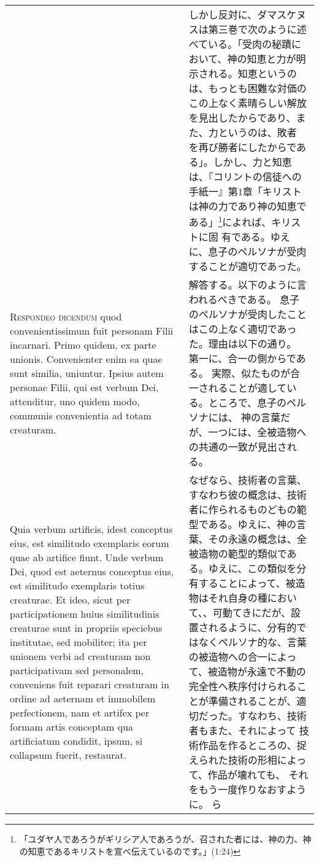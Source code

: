 \documentclass[10pt]{jsarticle} %
\begin{document}
\begin{longtable}{p{21em}p{21em}}
&

しかし反対に、ダマスケヌスは第三巻で次のように述べている。「受肉の秘蹟に
 おいて、神の知恵と力が明示される。知恵というのは、もっとも困難な対価の
 この上なく素晴らしい解放を見出したからであり、また、力というのは、敗者
 を再び勝者にしたからである」。しかし、力と知恵は、『コリントの信徒への
 手紙一』第1章「キリストは神の力であり神の知恵である」\footnote{「ユダヤ人であろうがギリシア人であろうが、召された者には、神の力、神の知恵であるキリストを宣べ伝えているのです。」(1:24)}によれば、キリストに固
 有である。ゆえに、息子のペルソナが受肉することが適切であった。

\\



{\scshape Respondeo dicendum} quod convenientissimum fuit personam Filii
incarnari. Primo quidem, ex parte unionis. Convenienter enim ea quae
sunt similia, uniuntur. Ipsius autem personae Filii, qui est verbum Dei,
attenditur, uno quidem modo, communis convenientia ad totam
creaturam. 

&


解答する。以下のように言われるべきである。
息子のペルソナが受肉したことはこの上なく適切であった。理由は以下の通り。
第一に、合一の側からである。
実際、似たものが合一されることが適している。ところで、息子のペルソナには、
 神の言葉だが、一つには、全被造物への共通の一致が見出される。


\\

Quia verbum artificis, idest conceptus eius, est similitudo
exemplaris eorum quae ab artifice fiunt. Unde verbum Dei, quod est
aeternus conceptus eius, est similitudo exemplaris totius creaturae. Et
ideo, sicut per participationem huius similitudinis creaturae sunt in
propriis speciebus institutae, sed mobiliter; ita per unionem verbi ad
creaturam non participativam sed personalem, conveniens fuit reparari
creaturam in ordine ad aeternam et immobilem perfectionem, nam et
artifex per formam artis conceptam qua artificiatum condidit, ipsum, si
collapsum fuerit, restaurat. 

&


なぜなら、技術者の言葉、すなわち彼の概念は、技術者に作られるものどもの範
 型である。ゆえに、神の言葉、その永遠の概念は、全被造物の範型的類似であ
 る。ゆえに、この類似を分有することによって、被造物はそれ自身の種におい
 て、、可動てきにだが、設置されるように、分有的ではなくペルソナ的な、言葉
 の被造物への合一によって、被造物が永遠で不動の完全性へ秩序付けられるこ
 とが準備されることが、適切だった。すなわち、技術者もまた、それによって
 技術作品を作るところの、捉えられた技術の形相によって、作品が壊れても、
 それをもう一度作りなおすように。
 ら



\end{longtable}
\end{document}
